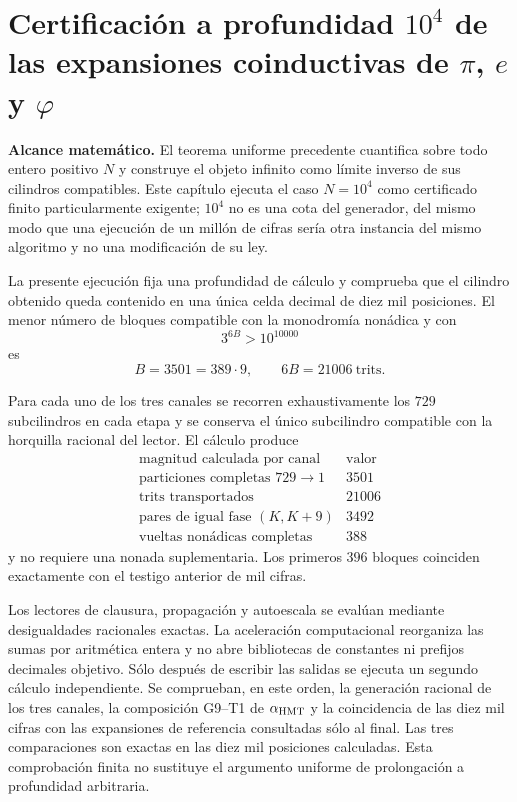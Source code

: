 \section{Certificación a profundidad \texorpdfstring{\(10^4\)}{10^4} de las expansiones coinductivas de \texorpdfstring{\(\pi\), \(e\) y \(\varphi\)}{pi, e y phi}}
\label{sec:truncamiento-10000-pi-e-phi-rev9}

\noindent\textbf{Alcance matemático.}
El teorema uniforme precedente cuantifica sobre todo entero positivo \(N\) y
construye el objeto infinito como límite inverso de sus cilindros compatibles.
Este capítulo ejecuta el caso \(N=10^4\) como certificado finito particularmente
exigente; \(10^4\) no es una cota del generador, del mismo modo que una ejecución
de un millón de cifras sería otra instancia del mismo algoritmo y no una
modificación de su ley.

La presente ejecución fija una profundidad de cálculo y comprueba que el
cilindro obtenido queda contenido en una única celda decimal de diez mil
posiciones. El menor número de bloques compatible con la monodromía nonádica
y con
\[
  3^{6B}>10^{10000}
\]
es
\[
  B=3501=389\cdot9,
  \qquad 6B=21006\ \text{trits}.
\]

Para cada uno de los tres canales se recorren exhaustivamente los \(729\)
subcilindros en cada etapa y se conserva el único subcilindro compatible con la horquilla
racional del lector. El cálculo produce
\[
 \begin{array}{c|r}
 \text{magnitud calculada por canal}&\text{valor}\\
 \hline
 \text{particiones completas }729\to1&3501\\
 \text{trits transportados}&21006\\
 \text{pares de igual fase }(K,K+9)&3492\\
 \text{vueltas nonádicas completas}&388
 \end{array}
\]
y no requiere una nonada suplementaria. Los primeros \(396\) bloques
coinciden exactamente con el testigo anterior de mil cifras.

Los lectores de clausura, propagación y autoescala se evalúan mediante
desigualdades racionales exactas. La aceleración computacional reorganiza las
sumas por aritmética entera y no abre bibliotecas de constantes ni prefijos
decimales objetivo. Sólo después de escribir las salidas se ejecuta un
segundo cálculo independiente. Se comprueban, en este orden, la
generación racional de los tres canales, la composición G9--T1 de
\(\alpha_{\rm HMT}\) y la coincidencia de las diez mil cifras con las
expansiones de referencia consultadas sólo al final. Las tres comparaciones
son exactas en las diez mil posiciones calculadas. Esta comprobación finita
no sustituye el argumento uniforme de prolongación a profundidad arbitraria.

